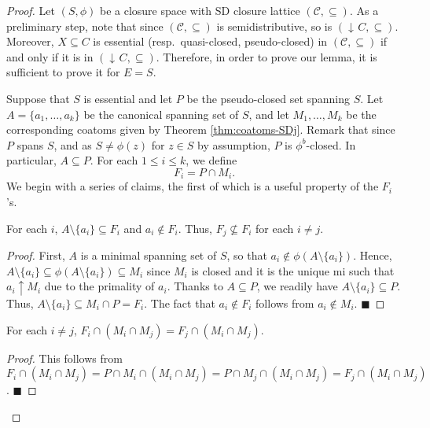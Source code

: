 \documentclass[12pt, a4paper]{article}
\def\arxiv{1}
\newcommand{\cc}[1]{\mathcal{#1}}  %
\newcommand{\U}{S}  %
\DeclareMathOperator{\idl}{\downarrow\!}  %
\DeclareMathOperator{\upp}{\uparrow}  %
\newcommand{\cl}{\phi}  %
\newcommand{\cs}{\cc{C}} %
\begin{document}
\begin{proof}
Let $(\U, \cl)$ be a closure space with SD closure lattice $(\cs, \subseteq)$.
As a preliminary step, note that since $(\cs, \subseteq)$ is semidistributive, so is $(\idl C, \subseteq)$.
Moreover, $X \subseteq C$ is essential (resp.~quasi-closed, pseudo-closed) in $(\cs, \subseteq)$ if and only if it is in $(\idl C, \subseteq)$.
Therefore, in order to prove our lemma, it is sufficient to prove it for $E = \U$.

Suppose that $\U$ is essential and let $P$ be the pseudo-closed set spanning $\U$.
Let $A = \{a_1, \dots, a_k\}$ be the canonical spanning set of $\U$, and let $M_1, \dots, M_k$ be the corresponding coatoms given by Theorem \ref{thm:coatoms-SDj}.
Remark that since $P$ spans $\U$, and as $\U \neq \cl(z)$ for $z \in \U$ by assumption, $P$ is $\cl^b$-closed.
In particular, $A \subseteq P$.
For each $1 \leq i \leq k$, we define
%
\[ F_i = P \cap M_i. \]
%
We begin with a series of claims, the first of which is a useful property of the $F_i$'s.

\begin{claim} \label{claim:F-incomp}
For each $i$, $A \setminus \{a_i\} \subseteq F_i$ and $a_i \notin F_i$.
Thus, $F_j \nsubseteq F_i$ for each $i \neq j$.
\end{claim}

\begin{proof}
First, $A$ is a minimal spanning set of $\U$, so that $a_i \notin \cl(A \setminus \{a_i\})$.
Hence, $A \setminus \{a_i\} \subseteq \cl(A \setminus \{a_i\}) \subseteq M_i$ since $M_i$ is closed and it is the unique mi such that $a_i \upp M_i$ due to the primality of $a_i$.
Thanks to $A \subseteq P$, we readily have $A \setminus \{a_i\} \subseteq P$.
Thus, $A \setminus \{a_i\} \subseteq M_i \cap P = F_i$.
The fact that $a_i \notin F_i$ follows from $a_i \notin M_i$.
\renewcommand{\qed}{$\blacksquare$}
\ifx\arxiv\undefined
\qed
\fi
\end{proof}

\begin{claim} \label{claim:F-cap-M}
For each $i \neq j$, $F_i \cap (M_i \cap M_j) = F_j \cap (M_i \cap M_j)$.
\end{claim}

\begin{proof}
This follows from $F_i \cap (M_i \cap M_j) = P \cap M_i \cap (M_i \cap M_j) = P \cap M_j \cap (M_i \cap M_j) = F_j \cap (M_i \cap M_j)$.
\renewcommand{\qed}{$\blacksquare$}
\ifx\arxiv\undefined
\qed
\fi
\end{proof}


\end{proof}
\end{document}
